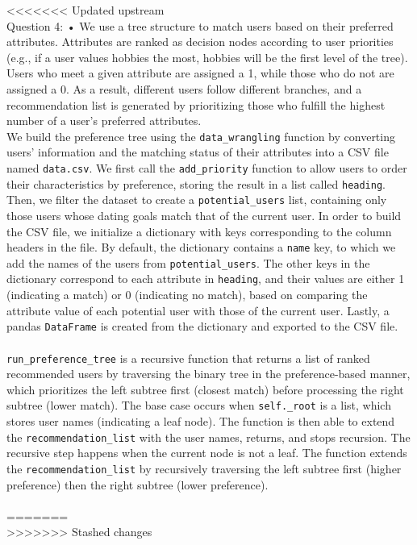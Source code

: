 \documentclass[fontsize=11pt]{article}
\begin{document}
<<<<<<< Updated upstream
\\
Question 4:
	• We use a tree structure to match users based on their preferred attributes. Attributes are ranked as decision nodes according to user priorities (e.g., if a user values hobbies the most, hobbies will be the first level of the tree). Users who meet a given attribute are assigned a 1, while those who do not are assigned a 0. As a result, different users follow different branches, and a recommendation list is generated by prioritizing those who fulfill the highest number of a user's preferred attributes.
\\
We build the preference tree using the \texttt{data\_wrangling} function by converting users' information and the matching status of their attributes into a CSV file named \texttt{data.csv}. We first call the \texttt{add\_priority} function to allow users to order their characteristics by preference, storing the result in a list called \texttt{heading}. Then, we filter the dataset to create a \texttt{potential\_users} list, containing only those users whose dating goals match that of the current user. In order to build the CSV file, we initialize a dictionary with keys corresponding to the column headers in the file. By default, the dictionary contains a \texttt{name} key, to which we add the names of the users from \texttt{potential\_users}. The other keys in the dictionary correspond to each attribute in \texttt{heading}, and their values are either 1 (indicating a match) or 0 (indicating no match), based on comparing the attribute value of each potential user with those of the current user. Lastly, a pandas \texttt{DataFrame} is created from the dictionary and exported to the CSV file.
\\
\\
\texttt{run\_preference\_tree} is a recursive function that returns a list of ranked recommended users by traversing the binary tree in the preference-based manner, which prioritizes the left subtree first (closest match) before processing the right subtree (lower match). The base case occurs when \texttt{self.\_root} is a list, which stores user names (indicating a leaf node). The function is then able to extend the \texttt{recommendation\_list} with the user names, returns, and stops recursion. The recursive step happens when the current node is not a leaf. The function extends the \texttt{recommendation\_list} by recursively traversing the left subtree first (higher preference) then the right subtree (lower preference).
\\
\\
=======
\\ 
>>>>>>> Stashed changes
\end{document}
